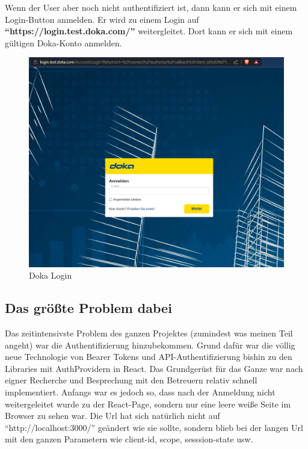 Wenn der User aber noch nicht authentifiziert ist, dann kann er sich mit einem 
Login-Button anmelden. Er wird zu einem Login auf \textbf{``https://login.test.doka.com/''} weitergleitet.
Dort kann er sich mit einem gültigen Doka-Konto anmelden.
\\
\begin{figure}[ht!]
  \centering
  \includegraphics[scale=.5]{pics/doka-login.PNG}
  \caption{\label{fig:The-caption}Doka Login }
  \label{fig:impl:use-case-diagramm}
\end{figure}
\newpage

\subsection*{Das größte Problem dabei}
Das zeitintensivste Problem des ganzen Projektes (zumindest was meinen Teil angeht) war die Authentifizierung hinzubekommen. Grund 
dafür war die völlig neue Technologie von Bearer Tokens und API-Authentifizierung bishin zu den Libraries mit AuthProvidern in React.
Das Grundgerüst für das Ganze war nach eigner Recherche und Besprechung mit den Betreuern relativ schnell implementiert. Anfangs war es 
jedoch so, dass nach der Anmeldung nicht weitergeleitet wurde zu der React-Page, sondern nur eine leere weiße Seite im Browser 
zu sehen war. Die Url hat sich natürlich nicht auf ``http://localhost:3000/'' geändert wie sie sollte, sondern blieb bei der langen Url mit 
den ganzen Parametern wie client-id, scope, sesssion-state usw. 

